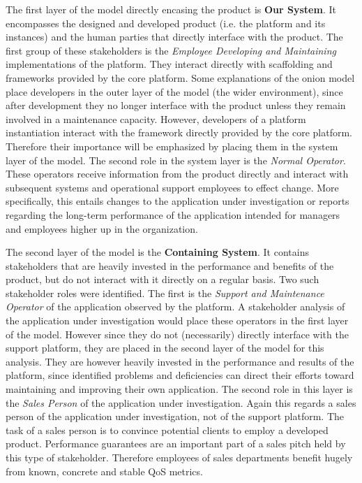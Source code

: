 The first layer of the model directly encasing the product is \textbf{Our System}. It encompasses the designed and developed product (i.e. the platform and its instances) and the human parties that directly interface with the product. The first group of these stakeholders is the \emph{Employee Developing and Maintaining} implementations of the platform. They interact directly with scaffolding and frameworks provided by the core platform. Some explanations of the onion model place developers in the outer layer of the model (the wider environment), since after development they no longer interface with the product unless they remain involved in a maintenance capacity. However, developers of a platform instantiation interact with the framework directly provided by the core platform. Therefore their importance will be emphasized by placing them in the system layer of the model. The second role in the system layer is the \emph{Normal Operator}. These operators receive information from the product directly and interact with subsequent systems and operational support employees to effect change. More specifically, this entails changes to the application under investigation or reports regarding the long-term performance of the application intended for managers and employees higher up in the organization.

The second layer of the model is the \textbf{Containing System}. It contains stakeholders that are heavily invested in the performance and benefits of the product, but do not interact with it directly on a regular basis. Two such stakeholder roles were identified. The first is the \emph{Support and Maintenance Operator} of the application observed by the platform. A stakeholder analysis of the application under investigation would place these operators in the first layer of the model. However since they do not (necessarily) directly interface with the support platform, they are placed in the second layer of the model for this analysis. They are however heavily invested in the performance and results of the platform, since identified problems and deficiencies can direct their efforts toward maintaining and improving their own application. The second role in this layer is the \emph{Sales Person} of the application under investigation. Again this regards a sales person of the application under investigation, not of the support platform. The task of a sales person is to convince potential clients to employ a developed product. Performance guarantees are an important part of a sales pitch held by this type of stakeholder. Therefore employees of sales departments benefit hugely from known, concrete and stable QoS metrics.

